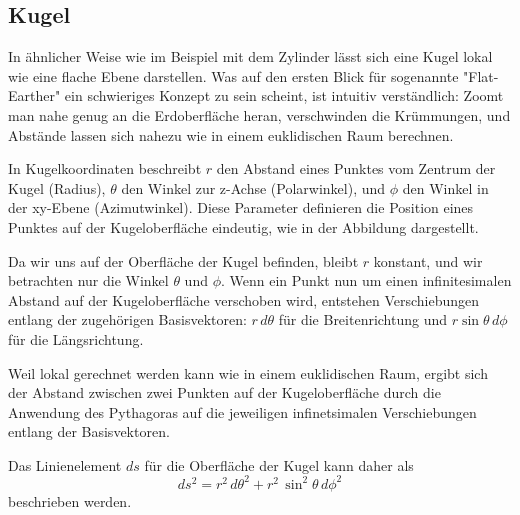 %
%
%
%
\subsection{Kugel\label{geodaeten:section:Linienelement:Kugel}}

In ähnlicher Weise wie im Beispiel mit dem Zylinder lässt sich eine Kugel lokal wie eine flache Ebene darstellen.
Was auf den ersten Blick für sogenannte "Flat-Earther" ein schwieriges Konzept zu sein scheint, ist intuitiv verständlich:
Zoomt man nahe genug an die Erdoberfläche heran, verschwinden die Krümmungen, und Abstände lassen sich nahezu wie in einem euklidischen Raum berechnen.

In Kugelkoordinaten beschreibt $r$ den Abstand eines Punktes vom Zentrum der Kugel (Radius), $\theta$ den Winkel zur z-Achse (Polarwinkel), und $\phi$ den Winkel in der xy-Ebene (Azimutwinkel).
Diese Parameter definieren die Position eines Punktes auf der Kugeloberfläche eindeutig, wie in der Abbildung dargestellt.

Da wir uns auf der Oberfläche der Kugel befinden, bleibt $r$ konstant, und wir betrachten nur die Winkel $\theta$ und $\phi$.
Wenn ein Punkt nun um einen infinitesimalen Abstand auf der Kugeloberfläche verschoben wird, entstehen Verschiebungen entlang der zugehörigen Basisvektoren:
$r \, d\theta$ für die Breitenrichtung und $r \sin\theta \, d\phi$ für die Längsrichtung.

Weil lokal gerechnet werden kann wie in einem euklidischen Raum, ergibt sich der Abstand zwischen zwei Punkten auf der Kugeloberfläche durch die Anwendung des Pythagoras auf die jeweiligen infinetsimalen Verschiebungen entlang der Basisvektoren.

Das Linienelement $ds$ für die Oberfläche der Kugel kann daher als
\begin{equation}
ds^2 = r^2 \, d\theta^2 + r^2 \, \sin^2\theta \, d\phi^2
\end{equation}
beschrieben werden.

